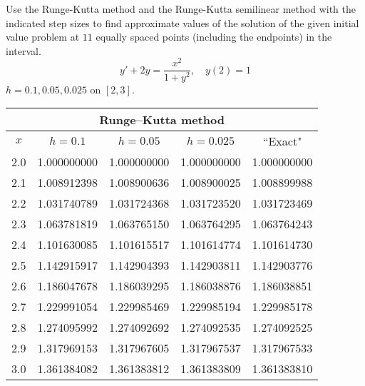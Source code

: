 \documentclass{ximera}
\begin{document}
\begin{problem}\label{exer:3.3.22} Use the Runge-Kutta method and the Runge-Kutta semilinear method with the indicated step sizes to find approximate values of the solution of the given initial value problem at $11$ equally spaced points (including the endpoints) in the interval.
$$y'+2y=\frac{x^2}{1+y^2},\quad y(2)=1$$
 $h=0.1,0.05,0.025$ on $[2,3]$.

 \begin{solution}
     {\small
\begin{tabular}{|c|r|r|r|r|}
\hline
\multicolumn{5}{|c|}{Runge--Kutta method}\\\hline
\multicolumn{1}{|c|}{$x$}&
\multicolumn{1}{|c|}{$h=0.1$}&
\multicolumn{1}{|c|}{$h=0.05$}&
\multicolumn{1}{|c|}{$h=0.025$}&
\multicolumn{1}{|c|}{``Exact"}\\ \hline
2.0 & 1.000000000 & 1.000000000 & 1.000000000 & 1.000000000 \\
2.1 & 1.008912398 & 1.008900636 & 1.008900025 & 1.008899988 \\
2.2 & 1.031740789 & 1.031724368 & 1.031723520 & 1.031723469 \\
2.3 & 1.063781819 & 1.063765150 & 1.063764295 & 1.063764243 \\
2.4 & 1.101630085 & 1.101615517 & 1.101614774 & 1.101614730 \\
2.5 & 1.142915917 & 1.142904393 & 1.142903811 & 1.142903776 \\
2.6 & 1.186047678 & 1.186039295 & 1.186038876 & 1.186038851 \\
2.7 & 1.229991054 & 1.229985469 & 1.229985194 & 1.229985178 \\
2.8 & 1.274095992 & 1.274092692 & 1.274092535 & 1.274092525 \\
2.9 & 1.317969153 & 1.317967605 & 1.317967537 & 1.317967533 \\
3.0 & 1.361384082 & 1.361383812 & 1.361383809 & 1.361383810 \\
\hline
\end{tabular}}


\end{solution}
\end{problem}
\end{document}
